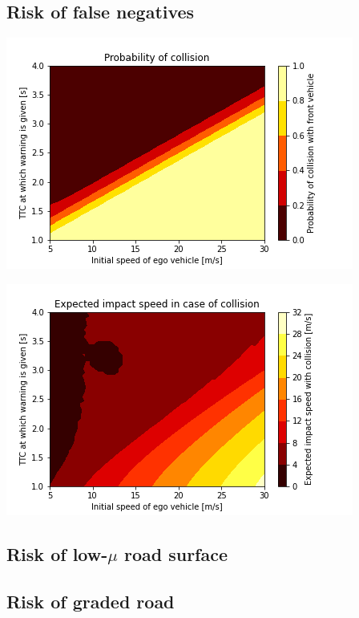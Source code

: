 \subsection{Risk of false negatives}
\label{sec:results false positives}

\includegraphics[width=.9\linewidth]{figures/fn_prob_v5_30_ttc1_4.png}

\includegraphics[width=.9\linewidth]{figures/fn_vimpact_v5_30_ttc1_4.png}




\subsection{Risk of low-$\mu$ road surface}
\label{sec:results low mu}



\subsection{Risk of graded road}
\label{sec:results slope}
